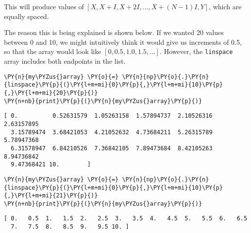 This will produce values of \([X, X+I, X+2I, ..., X+(N-1)I, Y]\), which
are equally spaced.

The reason this is being explained is shown below. If we wanted 20
values between 0 and 10, we might intuitively think it would give us
increments of 0.5, so that the array would look like
\([0,0.5,1.0,1.5,...]\). However, the \texttt{linspace} array includes
both endpoints in the list.

    \begin{tcolorbox}[breakable, size=fbox, boxrule=1pt, pad at break*=1mm,colback=cellbackground, colframe=cellborder]
\begin{Verbatim}[commandchars=\\\{\}]
\PY{n}{my\PYZus{}array} \PY{o}{=} \PY{n}{np}\PY{o}{.}\PY{n}{linspace}\PY{p}{(}\PY{l+m+mi}{0}\PY{p}{,}\PY{l+m+mi}{10}\PY{p}{,}\PY{l+m+mi}{20}\PY{p}{)}
\PY{n+nb}{print}\PY{p}{(}\PY{n}{my\PYZus{}array}\PY{p}{)}
\end{Verbatim}
\end{tcolorbox}

    \begin{Verbatim}[commandchars=\\\{\}]
[ 0.          0.52631579  1.05263158  1.57894737  2.10526316  2.63157895
  3.15789474  3.68421053  4.21052632  4.73684211  5.26315789  5.78947368
  6.31578947  6.84210526  7.36842105  7.89473684  8.42105263  8.94736842
  9.47368421 10.        ]
    \end{Verbatim}

    \begin{tcolorbox}[breakable, size=fbox, boxrule=1pt, pad at break*=1mm,colback=cellbackground, colframe=cellborder]
\begin{Verbatim}[commandchars=\\\{\}]
\PY{n}{my\PYZus{}array} \PY{o}{=} \PY{n}{np}\PY{o}{.}\PY{n}{linspace}\PY{p}{(}\PY{l+m+mi}{0}\PY{p}{,}\PY{l+m+mi}{10}\PY{p}{,}\PY{l+m+mi}{21}\PY{p}{)}
\PY{n+nb}{print}\PY{p}{(}\PY{n}{my\PYZus{}array}\PY{p}{)}
\end{Verbatim}
\end{tcolorbox}

    \begin{Verbatim}[commandchars=\\\{\}]
[ 0.   0.5  1.   1.5  2.   2.5  3.   3.5  4.   4.5  5.   5.5  6.   6.5
  7.   7.5  8.   8.5  9.   9.5 10. ]
    \end{Verbatim}

